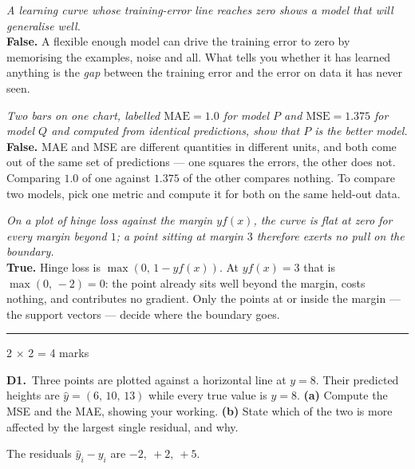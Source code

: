 \documentclass[10pt,a4paper]{article}
\newcommand{\parthead}[2]{\vspace{2pt}\noindent\rule{\linewidth}{0.4pt}\par\vspace{2pt}%
  \noindent{\bfseries Part #1}\hfill{\small #2}\par\vspace{1pt}}
\begin{document}
\begin{sC}

  \item \emph{A learning curve whose training-error line reaches zero shows a model that will generalise well.}\\[2pt] \textbf{False.} A flexible enough model can drive the training error to zero by memorising the examples, noise and all. What tells you whether it has learned anything is the \emph{gap} between the training error and the error on data it has never seen.

  \item \emph{Two bars on one chart, labelled $\mathrm{MAE} = 1.0$ for model $P$ and $\mathrm{MSE} = 1.375$ for model $Q$ and computed from identical predictions, show that $P$ is the better model.}\\[2pt] \textbf{False.} MAE and MSE are different quantities in different units, and both come out of the same set of predictions --- one squares the errors, the other does not. Comparing $1.0$ of one against $1.375$ of the other compares nothing. To compare two models, pick one metric and compute it for both on the same held-out data.

  \item \emph{On a plot of hinge loss against the margin $y f(x)$, the curve is flat at zero for every margin beyond $1$; a point sitting at margin $3$ therefore exerts no pull on the boundary.}\\[2pt] \textbf{True.} Hinge loss is $\max(0,\,1 - y f(x))$. At $y f(x) = 3$ that is $\max(0,\,-2) = 0$: the point already sits well beyond the margin, costs nothing, and contributes no gradient. Only the points at or inside the margin --- the support vectors --- decide where the boundary goes.

\end{sC}

\newpage

\parthead{D --- Short answer}{2 $\times$ 2 = 4 marks}

\textbf{D1.}\ Three points are plotted against a horizontal line at $y = 8$. Their predicted heights are $\hat{y} = (6,\,10,\,13)$ while every true value is $y = 8$. \textbf{(a)} Compute the MSE and the MAE, showing your working. \textbf{(b)} State which of the two is more affected by the largest single residual, and why.

\vspace{2pt}

The residuals $\hat y_i - y_i$ are $-2,\ +2,\ +5$.
\end{document}
